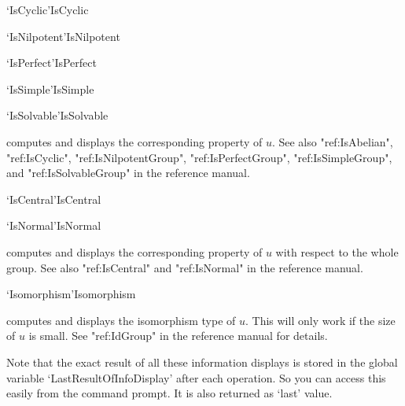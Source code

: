 \>`IsCyclic'{IsCyclic}

\>`IsNilpotent'{IsNilpotent}

\>`IsPerfect'{IsPerfect}

\>`IsSimple'{IsSimple}

\>`IsSolvable'{IsSolvable}

computes and displays the corresponding property of $u$.  See also
"ref:IsAbelian", "ref:IsCyclic", "ref:IsNilpotentGroup", "ref:IsPerfectGroup",
"ref:IsSimpleGroup", and "ref:IsSolvableGroup"  in the {\GAP}
reference manual.

\>`IsCentral'{IsCentral}

\>`IsNormal'{IsNormal}

computes and displays the corresponding  property of $u$ with respect  to
the whole group.  See also "ref:IsCentral" and "ref:IsNormal" in the {\GAP}
reference manual.

\>`Isomorphism'{Isomorphism}

computes and displays  the isomorphism type of  $u$.  This will only work
if the size of $u$ is small.  See "ref:IdGroup"  in the {\GAP}
reference manual for details.

\bigskip

Note that the exact result of all these information displays is stored in
the global variable `LastResultOfInfoDisplay' after each operation. So you
can access this easily from the {\GAP} command prompt. It is also returned
as `last' value.


%
%
%
%
%
%
%
%
%
%



